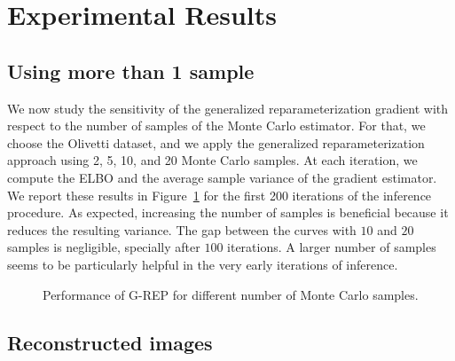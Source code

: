 \documentclass{article}
\begin{document}
\section{Experimental Results}

\subsection{Using more than 1 sample}

We now study the sensitivity of the generalized reparameterization gradient with respect to the number of samples of the Monte Carlo estimator.
%
For that, we choose the Olivetti dataset, and we apply the generalized reparameterization approach using 2, 5, 10, and 20 Monte Carlo samples. At each iteration, we compute the \gls{ELBO} and the average sample variance of the gradient estimator. We report these results in Figure~\ref{fig:nsamples} for the first 200 iterations of the inference procedure. As expected, increasing the number of samples is beneficial because it reduces the resulting variance. The gap between the curves with $10$ and $20$ samples is negligible, specially after $100$ iterations. A larger number of samples seems to be particularly helpful in the very early iterations of inference.

\begin{figure}[ht]
  \centering
   \qquad
  \caption{Performance of \acrshort{G-REP} for different number of Monte Carlo samples.\label{fig:nsamples}}
\end{figure}



\subsection{Reconstructed images}
\end{document}
